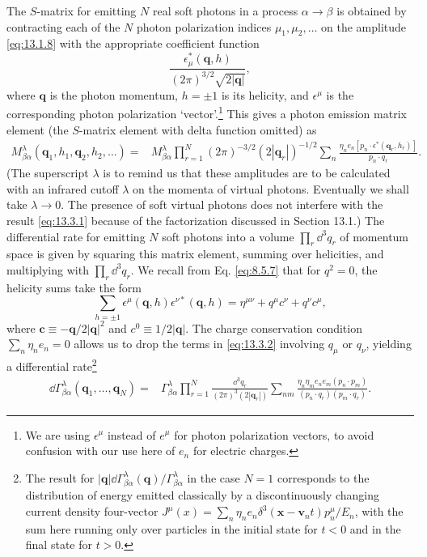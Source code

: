 The $S$-matrix for emitting $N$ real soft photons in a process
$\alpha\to\beta$ is obtained by contracting each of the $N$ photon
polarization indices $\mu_1,\mu_2,\ldots$ on the amplitude \eqref{eq:13.1.8}
with the appropriate coefficient function
\[
\frac{\epsilon^*_{\mu}(\mathbf q,h)}{(2\pi)^{3/2}\sqrt{2|\mathbf q|}},
\]
where $\mathbf q$ is the photon momentum, $h=\pm1$ is its helicity, and
$\epsilon^\mu$ is the corresponding photon polarization `vector'.\footnote{We
are using $\epsilon^\mu$ instead of $e^\mu$ for photon polarization vectors,
to avoid confusion with our use here of $e_n$ for electric charges.} This
gives a photon emission matrix element (the $S$-matrix element with delta
function omitted) as
\begin{align}
M^\lambda_{\beta\alpha}(\mathbf q_1,h_1,\mathbf q_2,h_2,\ldots)
={}&M^\lambda_{\beta\alpha}
\prod_{r=1}^{N}(2\pi)^{-3/2}(2|\mathbf q_r|)^{-1/2}
\sum_n\frac{\eta_n e_n[p_n\cdot\epsilon^*(\mathbf q_r,h_r)]}
{p_n\cdot q_r}.
\tag{13.3.1}\label{eq:13.3.1}
\end{align}
(The superscript $\lambda$ is to remind us that these amplitudes are to be
calculated with an infrared cutoff $\lambda$ on the momenta of virtual
photons. Eventually we shall take $\lambda\to0$. The presence of soft virtual
photons does not interfere with the result \eqref{eq:13.3.1} because of the
factorization discussed in Section 13.1.) The differential rate for emitting
$N$ soft photons into a volume $\prod_r \dd^3q_r$ of momentum space is given by
squaring this matrix element, summing over helicities, and multiplying with
$\prod_r \dd^3q_r$. We recall from Eq. \eqref{eq:8.5.7} that for $q^2=0$, the
helicity sums take the form
\begin{equation}
\sum_{h=\pm1}\epsilon^\mu(\mathbf q,h)\epsilon^{\nu*}(\mathbf q,h)
=\eta^{\mu\nu}+q^\mu c^\nu+q^\nu c^\mu,
\tag{13.3.2}\label{eq:13.3.2}
\end{equation}
where $\mathbf c\equiv-\mathbf q/2|\mathbf q|^2$ and
$c^0\equiv1/2|\mathbf q|$. The charge conservation condition
$\sum_n\eta_ne_n=0$ allows us to drop the terms in \eqref{eq:13.3.2}
involving $q_\mu$ or $q_\nu$, yielding a differential rate\footnote{The result
for $|\mathbf q|\dd\Gamma^\lambda_{\beta\alpha}(\mathbf q)/
\Gamma^\lambda_{\beta\alpha}$ in the case $N=1$ corresponds to the
distribution of energy emitted classically by a discontinuously changing
current density four-vector
$J^\mu(x)=\sum_n\eta_ne_n\delta^3(\mathbf x-\mathbf v_nt)p_n^\mu/E_n$,
with the sum here running only over particles in the initial state for $t<0$
and in the final state for $t>0$.}
\begin{align}
\dd\Gamma^\lambda_{\beta\alpha}(\mathbf q_1,\ldots,\mathbf q_N)
={}&\Gamma^\lambda_{\beta\alpha}
\prod_{r=1}^{N}\frac{\dd^3q_r}{(2\pi)^3(2|\mathbf q_r|)}
\sum_{nm}\frac{\eta_n\eta_m e_ne_m(p_n\cdot p_m)}
{(p_n\cdot q_r)(p_m\cdot q_r)}.
\tag{13.3.3}\label{eq:13.3.3}
\end{align}

